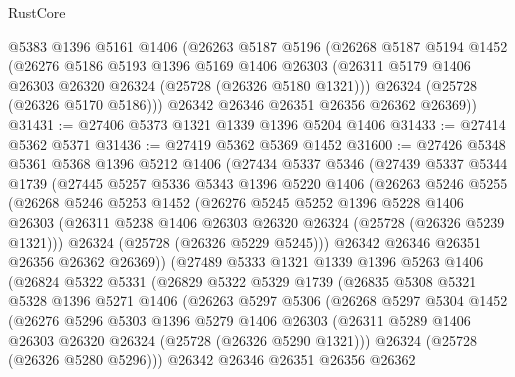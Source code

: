 \begin{lexlean}{RustCore}
\begin{coremodule}
    @5383
    @1396
    @5161
    @1406
    (@26263
      @5187
      @5196
      (@26268
        @5187
        @5194
        @1452
        (@26276
          @5186
          @5193
          @1396
          @5169
          @1406
          @26303
          (@26311 @5179 @1406 @26303 @26320 @26324 (@25728 (@26326 @5180 @1321)))
          @26324
          (@25728 (@26326 @5170 @5186)))
        @26342
        @26346
        @26351
        @26356
        @26362
        @26369))
@31431 := @27406 @5373 @1321 @1339 @1396 @5204 @1406
@31433 := @27414 @5362 @5371
@31436 := @27419 @5362 @5369 @1452
@31600 := @27426
    @5348
    @5361
    @5368
    @1396
    @5212
    @1406
    (@27434
      @5337
      @5346
      (@27439
        @5337
        @5344
        @1739
        (@27445
          @5257
          @5336
          @5343
          @1396
          @5220
          @1406
          (@26263
            @5246
            @5255
            (@26268
              @5246
              @5253
              @1452
              (@26276
                @5245
                @5252
                @1396
                @5228
                @1406
                @26303
                (@26311 @5238 @1406 @26303 @26320 @26324 (@25728 (@26326 @5239 @1321)))
                @26324
                (@25728 (@26326 @5229 @5245)))
              @26342
              @26346
              @26351
              @26356
              @26362
              @26369))
          (@27489
            @5333
            @1321
            @1339
            @1396
            @5263
            @1406
            (@26824
              @5322
              @5331
              (@26829
                @5322
                @5329
                @1739
                (@26835
                  @5308
                  @5321
                  @5328
                  @1396
                  @5271
                  @1406
                  (@26263
                    @5297
                    @5306
                    (@26268
                      @5297
                      @5304
                      @1452
                      (@26276
                        @5296
                        @5303
                        @1396
                        @5279
                        @1406
                        @26303
                        (@26311 @5289 @1406 @26303 @26320 @26324 (@25728 (@26326 @5290 @1321)))
                        @26324
                        (@25728 (@26326 @5280 @5296)))
                      @26342
                      @26346
                      @26351
                      @26356
                      @26362

\end{coremodule}
\end{lexlean}
